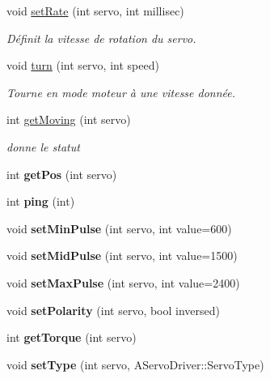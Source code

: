 \begin{DoxyCompactItemize}
void \hyperlink{classServoDriverMindstorm_a0ba2fb2410c22645e68bab76ab4921ac}{set\+Rate} (int servo, int millisec)
\begin{DoxyCompactList}\small\item\em Définit la vitesse de rotation du servo. \end{DoxyCompactList}\item 
\mbox{\label{classServoDriverMindstorm_a7c42fcb8fc10ef4e89fca3f7eb3d282e}} 
void \hyperlink{classServoDriverMindstorm_a7c42fcb8fc10ef4e89fca3f7eb3d282e}{turn} (int servo, int speed)
\begin{DoxyCompactList}\small\item\em Tourne en mode moteur à une vitesse donnée. \end{DoxyCompactList}\item 
int \hyperlink{classServoDriverMindstorm_acdb0988017ed22bad0bb3dcc848f03f1}{get\+Moving} (int servo)
\begin{DoxyCompactList}\small\item\em donne le statut \end{DoxyCompactList}\item 
\mbox{\label{classServoDriverMindstorm_a930ad1d057e0b6beb4660f9ad713a3a5}} 
int {\bfseries get\+Pos} (int servo)
\item 
\mbox{\label{classServoDriverMindstorm_ab1151ae150d5911a522cebf78412ffb8}} 
int {\bfseries ping} (int)
\item 
\mbox{\label{classServoDriverMindstorm_a62b010052f33ef157742ca09752b5277}} 
void {\bfseries set\+Min\+Pulse} (int servo, int value=600)
\item 
\mbox{\label{classServoDriverMindstorm_afff00212feb49ae0438d38a79bed4ca7}} 
void {\bfseries set\+Mid\+Pulse} (int servo, int value=1500)
\item 
\mbox{\label{classServoDriverMindstorm_a7a4449c0628145e2c19a14cc14c5821e}} 
void {\bfseries set\+Max\+Pulse} (int servo, int value=2400)
\item 
\mbox{\label{classServoDriverMindstorm_a4e8b0100b93bf8925f30b8aff678ded9}} 
void {\bfseries set\+Polarity} (int servo, bool inversed)
\item 
\mbox{\label{classServoDriverMindstorm_aa05d19585817d8e22bac66f73a9e4863}} 
int {\bfseries get\+Torque} (int servo)
\item 
\mbox{\label{classServoDriverMindstorm_a287349f54ca7d192be938f0acffa984a}} 
void {\bfseries set\+Type} (int servo, A\+Servo\+Driver\+::\+Servo\+Type)
\end{DoxyCompactItemize}
